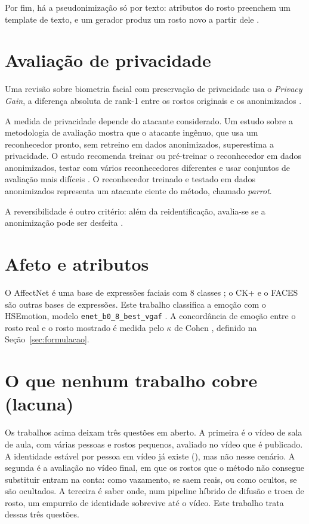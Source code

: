 Por fim, há a pseudonimização só por texto: atributos do rosto preenchem um template de texto, e um gerador produz um rosto novo a partir dele \citep{lee2026}.

\section{Avaliação de privacidade}

Uma revisão sobre biometria facial com preservação de privacidade usa o \emph{Privacy Gain}, a diferença absoluta de rank-1 entre os rostos originais e os anonimizados \citep{meden}.

A medida de privacidade depende do atacante considerado.
Um estudo sobre a metodologia de avaliação mostra que o atacante ingênuo, que usa um reconhecedor pronto, sem retreino em dados anonimizados, superestima a privacidade.
O estudo recomenda treinar ou pré-treinar o reconhecedor em dados anonimizados, testar com vários reconhecedores diferentes e usar conjuntos de avaliação mais difíceis \citep{hanisch}.
O reconhecedor treinado e testado em dados anonimizados representa um atacante ciente do método, chamado \emph{parrot}.

A reversibilidade é outro critério: além da reidentificação, avalia-se se a anonimização pode ser desfeita \citep{fantomas}.

\section{Afeto e atributos}

O AffectNet é uma base de expressões faciais com 8 classes \citep{affectnet}; o CK+ \citep{ck+} e o FACES \citep{faces} são outras bases de expressões.
Este trabalho classifica a emoção com o HSEmotion, modelo \texttt{enet\_b0\_8\_best\_vgaf} \citep{hsemotion}.
A concordância de emoção entre o rosto real e o rosto mostrado é medida pelo $\kappa$ de Cohen \citep{cohen}, definido na Seção~\ref{sec:formulacao}.

\section{O que nenhum trabalho cobre (lacuna)}

Os trabalhos acima deixam três questões em aberto.
A primeira é o vídeo de sala de aula, com várias pessoas e rostos pequenos, avaliado no vídeo que é publicado.
A identidade estável por pessoa em vídeo já existe (\citealp{fiva}), mas não nesse cenário.
A segunda é a avaliação no vídeo final, em que os rostos que o método não consegue substituir entram na conta: como vazamento, se saem reais, ou como ocultos, se são ocultados.
A terceira é saber onde, num pipeline híbrido de difusão e troca de rosto, um empurrão de identidade sobrevive até o vídeo.
Este trabalho trata dessas três questões.

